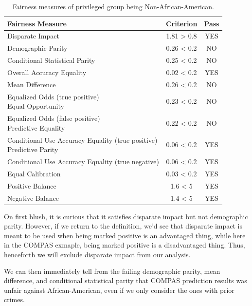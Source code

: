 \documentclass[conference]{IEEEtran}
\begin{document}
\begin{table}[h]
    \centering
    \begin{tabular}{|l|c|c|} %
        \hline
        \textbf{Fairness Measure} & \textbf{Criterion} & \textbf{Pass} \\
        \hline
Disparate Impact & 1.81 > 0.8 & YES \\
\hline
Demographic Parity & 0.26 < 0.2 & NO \\
\hline
Conditional Statistical Parity & 0.25 < 0.2 & NO \\
\hline
Overall Accuracy Equality & 0.02 < 0.2 & YES \\
\hline
Mean Difference & 0.26 < 0.2 & NO \\
\hline
\makecell[l]{Equalized Odds (true positive) \\ Equal Opportunity} & 0.23 < 0.2 & NO \\
\hline
\makecell[l]{Equalized Odds (false positive) \\ Predictive Equality} & 0.22 < 0.2 & NO \\
\hline
\makecell[l]{Conditional Use Accuracy Equality (true positive) \\ Predictive Parity} & 0.06 < 0.2 & YES \\
\hline
Conditional Use Accuracy Equality (true negative) & 0.06 < 0.2 & YES \\
\hline
Equal Calibration & 0.03 < 0.2 & YES \\
\hline
Positive Balance & 1.6 < 5 & YES \\
\hline
Negative Balance & 1.4 < 5 & YES \\
\hline
    \end{tabular}
    \caption{Fairness measures of privileged group being Non-African-American.}
    \label{tab:results}
\end{table}

On first blush, it is curious that it satisfies disparate impact but not demographic parity. However, if we return to the definition, we'd see that disparate impact is meant to be used when being marked positive is an advantaged thing, while here in the COMPAS exmaple, being marked positive is a disadvantaged thing. Thus, henceforth we will exclude disparate impact from our analysis.

We can then immediately tell from the failing demographic parity, mean difference, and conditional statistical parity that COMPAS prediction results was unfair against African-American, even if we only consider the ones with prior crimes.
\end{document}

